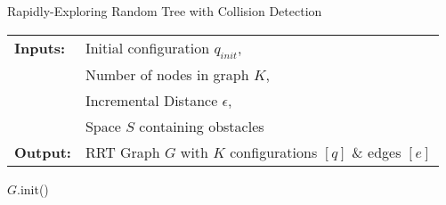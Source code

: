 \bigskip
\begin{algorithm}[H]
    \caption{Rapidly-Exploring Random Tree with Collision Detection}
    \SetAlgoLined
    \begin{tabular}{l l}
    \textbf{Inputs:}    & Initial \gls{configuration} $q_{init}$,\\ 
                        & Number of nodes in graph $K$, \\
                        & Incremental Distance $\epsilon$, \\
                        & Space $S$ containing obstacles \\
    \textbf{Output:}    & RRT Graph $G$ with $K$ \gls{configuration}s $[q]$ \& edges $[e]$ \\
    \end{tabular}

        $G$.init()\;
\label{algorithm:rrt_collision}
\end{algorithm}
\bigskip
